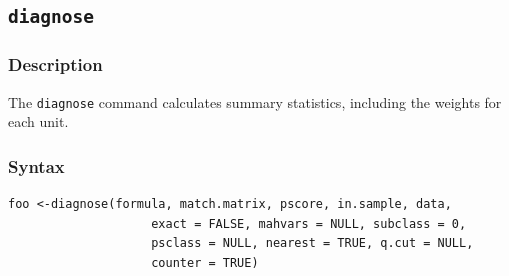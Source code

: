 \documentclass[oneside,letterpaper,titlepage]{article}
\begin{document}
\begin{appendix}
\subsection{\texttt{diagnose}}

\subsubsection{Description}
The \texttt{diagnose} command calculates summary statistics, including
the weights for each unit.

\subsubsection{Syntax}
\begin{verbatim}
foo <-diagnose(formula, match.matrix, pscore, in.sample, data,
                    exact = FALSE, mahvars = NULL, subclass = 0,
                    psclass = NULL, nearest = TRUE, q.cut = NULL,
                    counter = TRUE)
\end{verbatim} 


\end{appendix}
\end{document}
